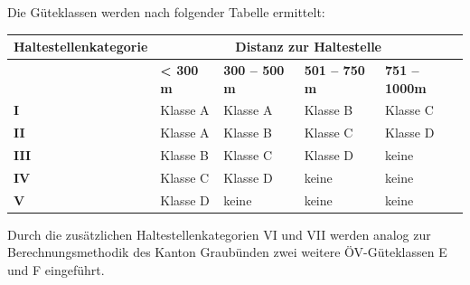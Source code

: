 \begin{itquote}
Die Güteklassen werden nach folgender Tabelle ermittelt:
\begin{table}[ht]
    \centering
    \begin{itquote}
    \begin{tabular}[c]{l p{2.2cm} p{2.2cm} p{2.2cm} p{2.2cm}}
        \toprule
        \textbf{Haltestellenkategorie}
                                & \multicolumn{4}{c}{\textbf{Distanz zur Haltestelle}}\\
        \midrule
        \textbf{}
                                & \textbf{< 300 m}
                                & \textbf{300 -- 500 m}
                                & \textbf{501 -- 750 m}
                                & \textbf{751 -- 1000m}\\
        \textbf{I}
                                & Klasse A
                                & Klasse A
                                & Klasse B
                                & Klasse C\\
        \textbf{II}
                                & Klasse A
                                & Klasse B
                                & Klasse C
                                & Klasse D\\
        \textbf{III}
                                & Klasse B
                                & Klasse C
                                & Klasse D
                                & keine\\
        \textbf{IV}
                                & Klasse C
                                & Klasse D
                                & keine
                                & keine\\
        \textbf{V}
                                & Klasse D
                                & keine
                                & keine
                                & keine\\
        \bottomrule
    \end{tabular}
    \end{itquote}
\end{table}
\end{itquote}

Durch die zusätzlichen Haltestellenkategorien VI und VII werden analog zur Berechnungsmethodik des Kanton Graubünden zwei weitere ÖV-Güteklassen E und F eingeführt.


